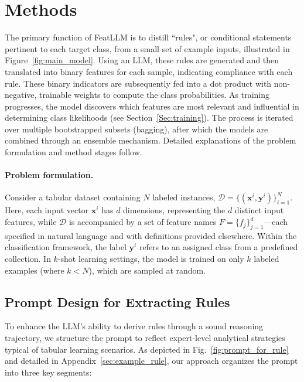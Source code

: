 \section{Methods}
The primary function of \textsf{FeatLLM} is to distill ``rules", or conditional statements pertinent to each target class, from a small set of example inputs, illustrated in Figure~\ref{fig:main_model}. Using an LLM, these rules are generated and then translated into binary features for each sample, indicating compliance with each rule. These binary indicators are subsequently fed into a dot product with non-negative, trainable weights to compute the class probabilities. As training progresses, the model discovers which features are most relevant and influential in determining class likelihoods (see Section~\ref{Sec:training}). The process is iterated over multiple bootstrapped subsets (bagging), after which the models are combined through an ensemble mechanism. Detailed explanations of the problem formulation and method stages follow.

\vspace*{-0.12in}
\paragraph{Problem formulation.} Consider a tabular dataset containing $N$ labeled instances, $\mathcal{D} = \{(\mathbf{x}^i, \mathbf{y}^i)\}_{i=1}^{N}$. Here, each input vector $\mathbf{x}^i$ has $d$ dimensions, representing the $d$ distinct input features, while $\mathcal{D}$ is accompanied by a set of feature names $F = \{f_j\}_{j=1}^{d}$—each specified in natural language and with definitions provided elsewhere. Within the classification framework, the label $\mathbf{y}^i$ refers to an assigned class from a predefined collection. In $k$-shot learning settings, the model is trained on only $k$ labeled examples (where $k < N$), which are sampled at random.

\subsection{Prompt Design for Extracting Rules}
\label{Sec:prompt_design}
To enhance the LLM's ability to derive rules through a sound reasoning trajectory, we structure the prompt to reflect expert-level analytical strategies typical of tabular learning scenarios. As depicted in Fig.~\ref{fig:prompt_for_rule} and detailed in Appendix~\ref{sec:example_rule}, our approach organizes the prompt into three key segments:

